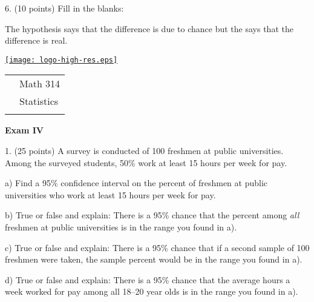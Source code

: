 \documentclass[10pt]{article}
\begin{document}
6. (10 points)  
Fill in the blanks: 
\bigskip

The \underline{\hspace{60pt}} hypothesis says that the difference is due to chance
but the \underline{\hspace{60pt}} says that the difference is real.  
\vfill
\eject

\vfill
\eject

\href{http://www.shepherd.edu}{\texttt{[image: logo-high-res.eps]}}
\vspace{-1.69cm}

{\small
\begin{tabular}{cl}
& Math 314\\
& Statistics\\
\hspace{5.28in} & %
\end{tabular}
}
\begin{center}
\textbf{\large  Exam IV}
\end{center}
\medskip

1. (25 points) A survey is conducted of 100 freshmen at public universities.
Among the surveyed  students, 50\%  work at least 15 hours per week for pay.

\hspace{20pt} a) Find a 95\% confidence interval
on the  percent of freshmen at public universities who work at least 15 hours per week for pay.
\vspace{2.3in}

\hspace{20pt} b) True or false and explain:  There is a 95\% chance that the
percent among \textit{all} freshmen at public universities is in the range you found in a).
\vspace{1.5in}

\hspace{20pt} c) True or false and explain:  There is a 95\% chance that
if a second sample of 100 freshmen were taken,
the sample percent would be in the range you found in a).
\vspace{1.5in}

\hspace{20pt} d) True or false and explain:  There is a 95\% chance that the
average hours a week worked for pay among all 18--20 year olds
is in the range you found in a).
\vspace{1in}
\vfill
\eject
{\ }
\end{document}
